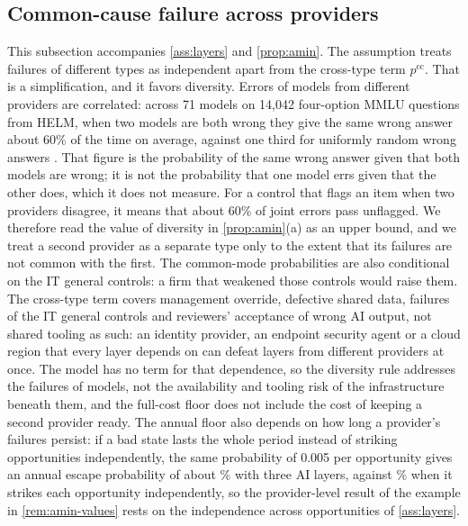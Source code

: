 \subsection{Common-cause failure across providers}\label{supp:model-commonmode}
This subsection accompanies \autoref{ass:layers} and \autoref{prop:amin}. The assumption treats failures of different types as independent apart from the cross-type term $p^{\mathrm{cc}}$. That is a simplification, and it favors diversity. Errors of models from different providers are correlated: across 71 models on 14,042 four-option MMLU questions from HELM, when two models are both wrong they give the same wrong answer about 60\% of the time on average, against one third for uniformly random wrong answers \citep{kim2025correlated}. That figure is the probability of the same wrong answer given that both models are wrong; it is not the probability that one model errs given that the other does, which it does not measure. For a control that flags an item when two providers disagree, it means that about 60\% of joint errors pass unflagged. We therefore read the value of diversity in \autoref{prop:amin}(a) as an upper bound, and we treat a second provider as a separate type only to the extent that its failures are not common with the first. The common-mode probabilities are also conditional on the IT general controls: a firm that weakened those controls would raise them. The cross-type term covers management override, defective shared data, failures of the IT general controls and reviewers' acceptance of wrong AI output, not shared tooling as such: an identity provider, an endpoint security agent or a cloud region that every layer depends on can defeat layers from different providers at once. The model has no term for that dependence, so the diversity rule addresses the failures of models, not the availability and tooling risk of the infrastructure beneath them, and the full-cost floor does not include the cost of keeping a second provider ready. The annual floor also depends on how long a provider's failures persist: if a bad state lasts the whole period instead of striking opportunities independently, the same probability of 0.005 per opportunity gives an annual escape probability of about \PersistEscapeThree\% with three AI layers, against \PersistIidFloor\% when it strikes each opportunity independently, so the provider-level result of the example in \autoref{rem:amin-values} rests on the independence across opportunities of \autoref{ass:layers}.

